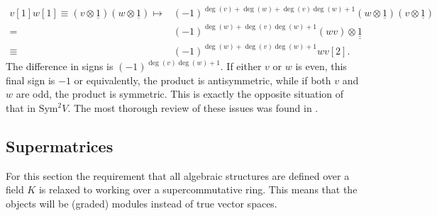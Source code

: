 \begin{remark}
        \begin{align*}
            v[1]w[1]\equiv(v\otimes\underline{1})(w\otimes\underline{1})\mapsto&(-1)^{\deg(v)+\deg(w)+\deg(v)\deg(w)+1}(w\otimes\underline{1})(v\otimes\underline{1})\\
            =&(-1)^{\deg(w)+\deg(v)\deg(w)+1}(wv)\otimes\underline{\underline{1}}\\
            \equiv&(-1)^{\deg(w)+\deg(v)\deg(w)+1}wv[2].
        \end{align*}
        The difference in signs is $(-1)^{\deg(v)\deg(w)+1}$. If either $v$ or $w$ is even, this final sign is $-1$ or equivalently, the product is antisymmetric, while if both $v$ and $w$ are odd, the product is symmetric. This is exactly the opposite situation of that in $\text{Sym}^2V$. The most thorough review of these issues was found in \cite{MitiAntonioMichele2021Hcmi}.
    \end{remark}

\subsection{Supermatrices}

    For this section the requirement that all algebraic structures are defined over a field $K$ is relaxed to working over a supercommutative ring. This means that the objects will be (graded) modules instead of true vector spaces.

